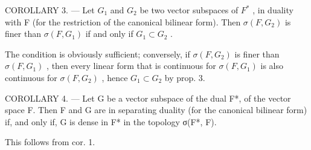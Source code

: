COROLLARY 3. --- Let \(G_{1}\) and \(G_{2}\) be two vector subspaces of \(F^{*}\) , in duality with F (for the restriction of the canonical bilinear form). Then \(\sigma(F, G_{2})\) is finer than \(\sigma(F, G_{1})\) if and only if \(G_{1} \subset G_{2}\) .

The condition is obviously sufficient; conversely, if \(\sigma(F, G_2)\) is finer than \(\sigma(F, G_1)\) , then every linear form that is continuous for \(\sigma(F, G_1)\) is also continuous for \(\sigma(F, G_2)\) , hence \(G_1 \subset G_2\) by prop. 3.

COROLLARY 4. --- Let G be a vector subspace of the dual F*, of the vector space F. Then F and G are in separating duality (for the canonical bilinear form) if, and only if, G is dense in F* in the topology σ(F*, F).

This follows from cor. 1.

